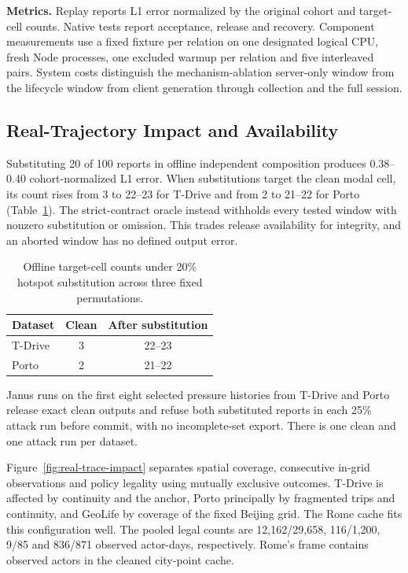 \documentclass[conference,compsoc]{IEEEtran}
\theoremstyle{definition}
\numberwithin{equation}{section}
\numberwithin{table}{section}
\numberwithin{figure}{section}
\theoremstyle{plain}
\begin{document}
\textbf{Metrics.} Replay reports L1 error normalized by the original cohort and target-cell counts. Native tests report acceptance, release and recovery. Component measurements use a fixed fixture per relation on one designated logical CPU, fresh Node processes, one excluded warmup per relation and five interleaved pairs. System costs distinguish the mechanism-ablation server-only window from the lifecycle window from client generation through collection and the full session.

\subsection{Real-Trajectory Impact and Availability}
\label{sec:eval-real-traces}

Substituting 20 of 100 reports in offline independent composition produces
0.38--0.40 cohort-normalized L1 error. When substitutions target the clean
modal cell, its count rises from 3 to 22--23 for T-Drive and from 2 to 21--22 for Porto
(Table~\ref{tab:hotspot-impact}). The strict-contract oracle instead
withholds every tested window with nonzero substitution or omission. This
trades release availability for integrity, and an aborted window has no
defined output error.

\begin{table}[t]
\centering
\caption{Offline target-cell counts under 20\% hotspot substitution across three fixed permutations.}
\label{tab:hotspot-impact}
\footnotesize
\begin{tabular}{@{}lcc@{}}
\toprule
Dataset & Clean & After substitution \\
\midrule
T-Drive & 3 & 22--23 \\
Porto & 2 & 21--22 \\
\bottomrule
\end{tabular}
\end{table}

Janus runs on the first eight selected pressure histories from T-Drive and Porto
release exact clean outputs and refuse both substituted reports in each
25\% attack run before commit, with no incomplete-set export. There is one
clean and one attack run per dataset.

Figure~\ref{fig:real-trace-impact} separates spatial coverage, consecutive in-grid observations and policy legality using mutually exclusive outcomes. T-Drive is affected by continuity and the anchor, Porto principally by fragmented trips and continuity, and GeoLife by coverage of the fixed Beijing grid. The Rome cache fits this configuration well. The pooled legal counts are 12,162/29,658, 116/1,200, 9/85 and 836/871 observed actor-days, respectively. Rome's frame contains observed actors in the cleaned city-point cache.
\end{document}
